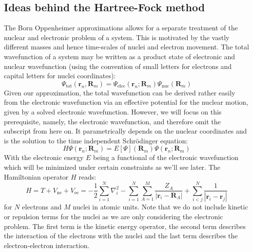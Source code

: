 \subsection{Ideas behind the Hartree-Fock method}
\label{subsec:background_hf}
The Born Oppenheimer approximations allows for a separate treatment of the nuclear and electronic problem of a system. This is motivated by the vastly different masses and hence time-scales of nuclei and electron movement. The total wavefunction of a system may be written as a product state of electronic and nuclear wavefunction (using the convention of small letters for electrons and capital letters for nuclei coordinates):
\begin{equation}
    \Psi_{\text{tot}}(\mathbf{r}_n, \mathbf{R}_m) = \Psi_{\text{elec}}(\mathbf{r}_n; \mathbf{R}_m) \Psi_{\text{nuc}}(\mathbf{R}_m)
\end{equation}
Given our approximation, the total wavefunction can be derived rather easily from the electronic wavefunction via an effective potential for the nuclear motion, given by a solved electronic wavefunction. However, we will focus on this prerequisite, namely, the electronic wavefunction, and therefore omit the subscript from here on. It parametrically depends on the nuclear coordinates and is the solution to the time independent Schrödinger equation:
\begin{equation}
    H \Psi(\mathbf{r}_n; \mathbf{R}_m) = E[\Psi](\mathbf{R}_m) \Psi(\mathbf{r}_n; \mathbf{R}_m)
\end{equation}
With the electronic energy $E$ being a functional of the electronic wavefunction which will be minimized under certain constraints as we'll see later. 
The Hamiltonian operator $H$ reads: 
\begin{equation}
    H = T + V_{\text{ne}} + V_{\text{ee}} = -\frac{1}{2} \sum_{i=1}^N \nabla_i^2 - \sum_{i=1}^N \sum_{A=1}^M \frac{Z_A}{|\mathbf{r}_i - \mathbf{R}_A|} + \sum_{i<j}^N \frac{1}{|\mathbf{r}_i - \mathbf{r}_j|}
\end{equation}
for $N$ electrons and $M$ nuclei in atomic units. Note that we do not include kinetic or repulsion terms for the nuclei as we are only considering the electronic problem. The first term is the kinetic energy operator, the second term describes the interaction of the electrons with the nuclei and the last term describes the electron-electron interaction.\\

